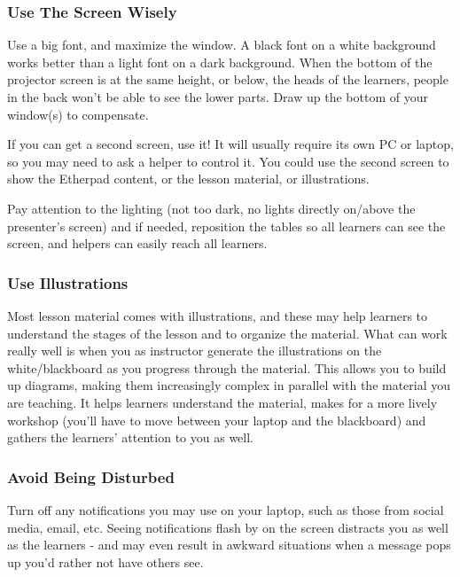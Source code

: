 \subsubsection{Use The Screen Wisely}\label{use-the-screen-wisely}

Use a big font, and maximize the window. A black font on a white
background works better than a light font on a dark background. When the
bottom of the projector screen is at the same height, or below, the
heads of the learners, people in the back won't be able to see the lower
parts. Draw up the bottom of your window(s) to compensate.

If you can get a second screen, use it! It will usually require its own
PC or laptop, so you may need to ask a helper to control it. You could
use the second screen to show the Etherpad content, or the lesson
material, or illustrations.

Pay attention to the lighting (not too dark, no lights directly on/above
the presenter's screen) and if needed, reposition the tables so all
learners can see the screen, and helpers can easily reach all learners.

\subsubsection{Use Illustrations}\label{use-illustrations}

Most lesson material comes with illustrations, and these may help
learners to understand the stages of the lesson and to organize the
material. What can work really well is when you as instructor generate
the illustrations on the white/blackboard as you progress through the
material. This allows you to build up diagrams, making them increasingly
complex in parallel with the material you are teaching. It helps
learners understand the material, makes for a more lively workshop
(you'll have to move between your laptop and the blackboard) and gathers
the learners' attention to you as well.

\subsubsection{Avoid Being Disturbed}\label{avoid-being-disturbed}

Turn off any notifications you may use on your laptop, such as those
from social media, email, etc. Seeing notifications flash by on the
screen distracts you as well as the learners - and may even result in
awkward situations when a message pops up you'd rather not have others
see.

